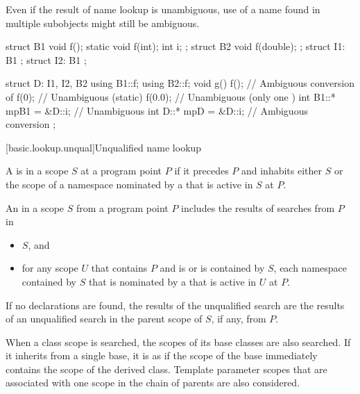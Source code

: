 \pnum
\begin{note}
Even if the result of name lookup is unambiguous, use of a name found in
multiple subobjects might still be
ambiguous.
\end{note}
\begin{example}
\begin{codeblock}
struct B1 {
  void f();
  static void f(int);
  int i;
};
struct B2 {
  void f(double);
};
struct I1: B1 { };
struct I2: B1 { };

struct D: I1, I2, B2 {
  using B1::f;
  using B2::f;
  void g() {
    f();                        // Ambiguous conversion of 
    f(0);                       // Unambiguous (static)
    f(0.0);                     // Unambiguous (only one )
    int B1::* mpB1 = &D::i;     // Unambiguous
    int D::* mpD = &D::i;       // Ambiguous conversion
  }
};
\end{codeblock}
\end{example}

[basic.lookup.unqual]{Unqualified name lookup}

%

\pnum
A  is
 in a scope $S$ at a program point $P$
if it precedes $P$ and inhabits either $S$ or
the scope of a namespace nominated by a 
that is active in $S$ at $P$.

\pnum
An  in a scope $S$ from a program point $P$
includes the results of searches from $P$ in
\begin{itemize}
\item
$S$, and
\item
for any scope $U$ that contains $P$ and is or is contained by $S$,
each namespace contained by $S$ that is nominated by
a  that is active in $U$ at $P$.
\end{itemize}
If no declarations are found,
the results of the unqualified search are
the results of an unqualified search in the parent scope of $S$, if any,
from $P$.
\begin{note}
When a class scope is searched,
the scopes of its base classes are also searched.
If it inherits from a single base,
it is as if the scope of the base immediately contains
the scope of the derived class.
Template parameter scopes
that are associated with one scope in the chain of parents
are also considered.
\end{note}

